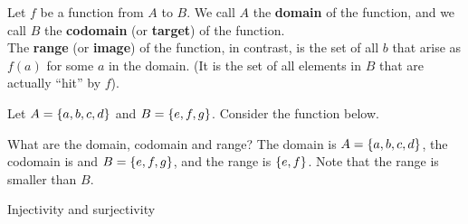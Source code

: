\documentclass[10pt]{beamer}
\begin{document}
\begin{frame}
\footnotesize 
\begin{mygreenbox}[title=Definitions (Hampkins pp. 128)]
Let $f$ be a function from $A$ to $B$.  We call $A$ the \textbf{domain} of the function, and we call $B$ the \textbf{codomain} (or \textbf{target}) of the function.   \\

The \textbf{range} (or \textbf{image}) of  the function, in contrast, is the set of all $b$ that arise as $f(a)$ for some $a$ in the domain. (It is the set of all elements in 
$B$ that are actually \enquote{hit} by $f$).

\end{mygreenbox}
 
\vfill 
\begin{myyellowbox}[title=Poll]

Let $A=\{ {a,b,c,d} \}$ and $B=\{ {e,f,g} \}$. Consider the function below.

\begin{center}
\end{center}


What are the domain, codomain and range? \pause The domain is  $A=\{ {a,b,c,d} \}$, the codomain is and $B=\{ {e,f,g} \}$, and the range is $\{ {e,f} \}$. Note that the range is smaller than $B$.
\end{myyellowbox}
	
\end{frame}


\begin{frame}[standout]
Injectivity and surjectivity
\end{frame}
\end{document}
